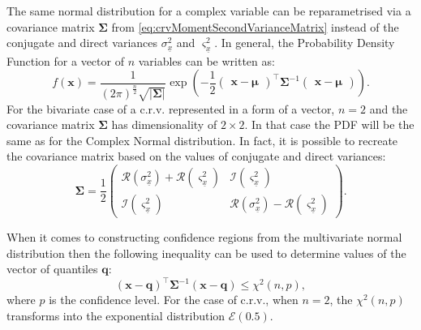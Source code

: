 \documentclass[
]{book}
\begin{document}
The same normal distribution for a complex variable can be reparametrised via a covariance matrix \(\boldsymbol{\Sigma}\) from \eqref{eq:crvMomentSecondVarianceMatrix} instead of the conjugate and direct variances \(\sigma_{\underline{x}}^2\) and \(\varsigma_{\underline{x}}^2\). In general, the Probability Density Function for a vector of \(n\) variables can be written as:
\begin{equation}
    f(\mathbf{x}) = \frac{1}{(2 \pi)^{\frac{n}{2}} \sqrt{|\boldsymbol{\Sigma}|}} \exp\left(- \frac{1}{2}
        \begin{pmatrix} \mathbf{x} - \boldsymbol{\mu} \end{pmatrix}^\top \boldsymbol{\Sigma}^{-1} \begin{pmatrix} \mathbf{x} - \boldsymbol{\mu} \end{pmatrix}
    \right).
    \label{eq:MultivariateNormalPDF}
\end{equation}
For the bivariate case of a c.r.v. represented in a form of a vector, \(n=2\) and the covariance matrix \(\boldsymbol{\Sigma}\) has dimensionality of \(2 \times 2\). In that case the PDF will be the same as for the Complex Normal distribution. In fact, it is possible to recreate the covariance matrix based on the values of conjugate and direct variances:
\begin{equation}
    \boldsymbol{\Sigma} = \frac{1}{2} \begin{pmatrix} \mathcal{R}(\sigma_{\underline{x}}^2) + \mathcal{R}(\varsigma_{\underline{x}}^2) & \mathcal{I}(\varsigma_{\underline{x}}^2) \\
                                                      \mathcal{I}(\varsigma_{\underline{x}}^2) & \mathcal{R}(\sigma_{\underline{x}}^2) - \mathcal{R}(\varsigma_{\underline{x}}^2) \end{pmatrix} .
    \label{eq:MultivariateNormalPDFCovariance}
\end{equation}

When it comes to constructing confidence regions from the multivariate normal distribution then the following inequality can be used to determine values of the vector of quantiles \(\mathbf{q}\):
\begin{equation}
    (\mathbf{x} - \mathbf{q})^{\top} \mathbf{\Sigma}^{-1} (\mathbf{x} - \mathbf{q}) \leq \chi^2(n, p) ,
    \label{eq:MultivariateNormalRegion}
\end{equation}
where \(p\) is the confidence level. For the case of c.r.v., when \(n=2\), the \(\chi^2(n, p)\) transforms into the exponential distribution \(\mathcal{E}(0.5)\).
\end{document}
